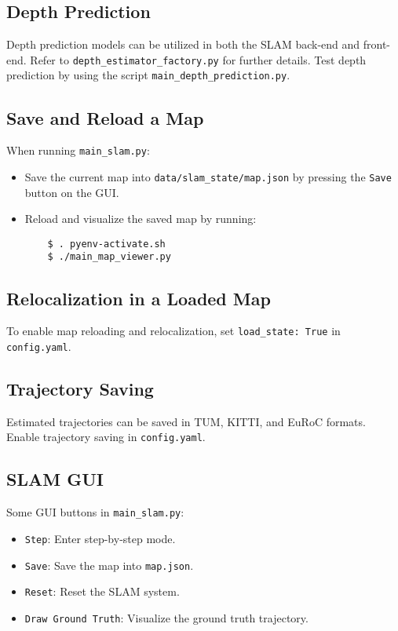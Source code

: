 \documentclass{article}
\begin{document}
\subsection{Depth Prediction}
Depth prediction models can be utilized in both the SLAM back-end and front-end. Refer to \texttt{depth\_estimator\_factory.py} for further details. Test depth prediction by using the script \texttt{main\_depth\_prediction.py}.

\subsection{Save and Reload a Map}
When running \texttt{main\_slam.py}:
\begin{itemize}
    \item Save the current map into \texttt{data/slam\_state/map.json} by pressing the \texttt{Save} button on the GUI.
    \item Reload and visualize the saved map by running:
    \begin{verbatim}
    $ . pyenv-activate.sh
    $ ./main_map_viewer.py
    \end{verbatim}
\end{itemize}

\subsection{Relocalization in a Loaded Map}
To enable map reloading and relocalization, set \texttt{load\_state: True} in \texttt{config.yaml}.

\subsection{Trajectory Saving}
Estimated trajectories can be saved in TUM, KITTI, and EuRoC formats. Enable trajectory saving in \texttt{config.yaml}.

\subsection{SLAM GUI}
Some GUI buttons in \texttt{main\_slam.py}:
\begin{itemize}
    \item \texttt{Step}: Enter step-by-step mode.
    \item \texttt{Save}: Save the map into \texttt{map.json}.
    \item \texttt{Reset}: Reset the SLAM system.
    \item \texttt{Draw Ground Truth}: Visualize the ground truth trajectory.
\end{itemize}
\end{document}
